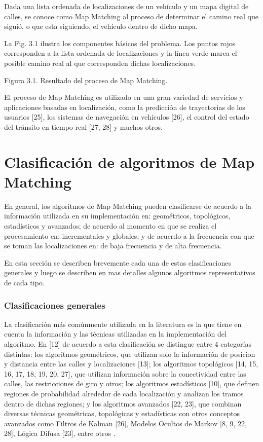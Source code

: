 \documentclass[final,fmstyle]{fpunathesis}
\begin{document}
Dada una lista ordenada de localizaciones de un vehículo y un mapa digital de calles, se conoce como Map Matching al proceso de determinar el camino real que siguió, o que esta siguiendo, el vehículo dentro de dicho mapa.

La Fig. 3.1 ilustra los componentes básicos del problema. Los puntos rojos corresponden a la lista ordenada de localizaciones y la línea verde marca el posible camino real al que corresponden dichas localizaciones.

Figura 3.1. Resultado del proceso de Map Matching.

El proceso de Map Matching es utilizado en una gran variedad de servicios y aplicaciones basadas en localización, como la predicción de trayectorias de los usuarios [25], los sistemas de navegación en vehículos [26], el control del estado del tránsito en tiempo real [27, 28] y muchos otros.

\section{Clasificación de algoritmos de Map Matching}

En general, los algoritmos de Map Matching pueden clasificarse de acuerdo a la información utilizada en su implementación en: geométricos, topológicos, estadísticos y avanzados; de acuerdo al momento en que se realiza el procesamiento en: incrementales y globales; y de acuerdo a la frecuencia con que se toman las localizaciones en: de baja frecuencia y de alta frecuencia.

En esta sección se describen brevemente cada una de estas clasificaciones generales y luego se describen en mas detalles algunos algoritmos representativos de cada tipo.

\subsubsection{Clasificaciones generales}

La clasificación más comúnmente utilizada en la literatura es la que tiene en cuenta la información y las técnicas utilizadas en la implementación del algoritmo. En [12] de acuerdo a esta clasificación se distingue entre 4 categorías distintas: los algoritmos geométricos, que utilizan solo la información de posicion y distancia entre las calles y localizaciones [13]; los algoritmos topológicos [14, 15, 16, 17, 18, 19, 20, 27], que utilizan información sobre la conectividad entre las calles, las restricciones de giro y otros; los algoritmos estadísticos [10], que definen regiones de probabilidad alrededor de cada localización y analizan los tramos dentro de dichas regiones; y los algoritmos avanzados [22, 23], que combinan diversas técnicas geométricas, topológicas y estadísticas con otros conceptos avanzados como Filtros de Kalman [26], Modelos Ocultos de Markov [8, 9, 22, 28], Lógica Difusa [23], entre otros .
\end{document}
